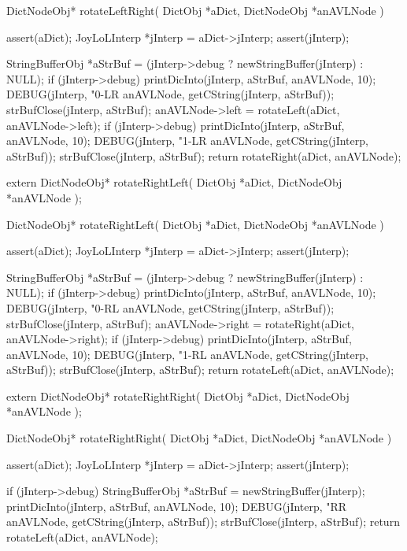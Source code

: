 \startCCode
DictNodeObj* rotateLeftRight(
  DictObj     *aDict,
  DictNodeObj *anAVLNode
) {
  assert(aDict);
  JoyLoLInterp *jInterp = aDict->jInterp;
  assert(jInterp);
  
  StringBufferObj *aStrBuf =
    (jInterp->debug ? newStringBuffer(jInterp) : NULL);
  if (jInterp->debug) {
    printDicInto(jInterp, aStrBuf, anAVLNode, 10);
    DEBUG(jInterp, "0-LR %
      anAVLNode, getCString(jInterp, aStrBuf));
    strBufClose(jInterp, aStrBuf);
  }
  anAVLNode->left = rotateLeft(aDict, anAVLNode->left);
  if (jInterp->debug) {
    printDicInto(jInterp, aStrBuf, anAVLNode, 10);
    DEBUG(jInterp, "1-LR %
      anAVLNode, getCString(jInterp, aStrBuf));
    strBufClose(jInterp, aStrBuf);
  }
  return rotateRight(aDict, anAVLNode);
}
\stopCCode

\startCHeader
extern DictNodeObj* rotateRightLeft(
  DictObj     *aDict,
  DictNodeObj *anAVLNode
);
\stopCHeader

\startCCode
DictNodeObj* rotateRightLeft(
  DictObj     *aDict,
  DictNodeObj *anAVLNode
) {
  assert(aDict);
  JoyLoLInterp *jInterp = aDict->jInterp;
  assert(jInterp);
  
  StringBufferObj *aStrBuf =
    (jInterp->debug ? newStringBuffer(jInterp) : NULL);
  if (jInterp->debug) {
    printDicInto(jInterp, aStrBuf, anAVLNode, 10);
    DEBUG(jInterp, "0-RL %
      anAVLNode, getCString(jInterp, aStrBuf));
    strBufClose(jInterp, aStrBuf);
  }
  anAVLNode->right = rotateRight(aDict, anAVLNode->right);
  if (jInterp->debug) {
    printDicInto(jInterp, aStrBuf, anAVLNode, 10);
    DEBUG(jInterp, "1-RL %
      anAVLNode, getCString(jInterp, aStrBuf));
    strBufClose(jInterp, aStrBuf);
  }
  return rotateLeft(aDict, anAVLNode);
}
\stopCCode

\startCHeader
extern DictNodeObj* rotateRightRight(
  DictObj     *aDict,
  DictNodeObj *anAVLNode
);
\stopCHeader

\startCCode
DictNodeObj* rotateRightRight(
  DictObj     *aDict,
  DictNodeObj *anAVLNode
) {
  assert(aDict);
  JoyLoLInterp *jInterp = aDict->jInterp;
  assert(jInterp);
  
  if (jInterp->debug) {
    StringBufferObj *aStrBuf = newStringBuffer(jInterp);
    printDicInto(jInterp, aStrBuf, anAVLNode, 10);
    DEBUG(jInterp, "RR %
      anAVLNode, getCString(jInterp, aStrBuf));
    strBufClose(jInterp, aStrBuf);
  }
  return rotateLeft(aDict, anAVLNode);
}
\stopCCode

